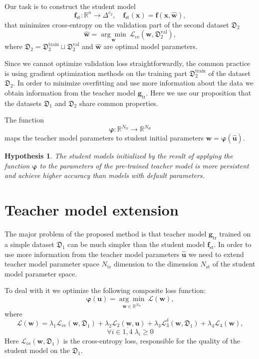 \documentclass[conference]{IEEEtran}
\begin{document}
Our task is to construct the student model
\[\mathbf{f}_\text{st}: \mathbb{R}^{n} \rightarrow \Delta^{c_2},\quad \mathbf{f}_\text{st}(\mathbf{x}) = \mathbf{f}(\mathbf{x}, \hat{\mathbf{w}}),\]
that minimizes cross-entropy on the validation part of the second dataset $\mathfrak{D}_2$
\[\hat{\mathbf{w}} =  \underset{\mathbf{w}}{\arg\min}~\mathcal{L}_\text{ce}(\mathbf{w}, \mathfrak{D}^\text{val}_2),\]
where $\mathfrak{D}_2 = \mathfrak{D}^\text{train}_2 \sqcup \mathfrak{D}^{\text{val}}_2$ and $\hat{\mathbf{w}}$ are optimal model parameters.

Since we cannot optimize validation loss straightforwardly, the common practice is using gradient optimization methods on the training part $\mathfrak{D}^\text{train}_2$ of the dataset $\mathfrak{D}_2$. In order to minimize overfitting and use more information about the data we obtain information from the teacher model $\mathbf{g}_{\text{tr}}$. Here we use our proposition that the datasets $\mathfrak{D}_1$ and $\mathfrak{D}_2$ share common properties. 

The function 
\[\boldsymbol{\varphi}: \mathbb{R}^{N_\text{tr}} \rightarrow \mathbb{R}^{N_\text{st}}\]
maps the teacher model parameters to student initial parameters $\mathbf{w} = \boldsymbol{\varphi}(\hat{\mathbf{u}})$.

\newtheorem{hypothesis}{Hypothesis}
\begin{hypothesis}
The student models initialized by the result of applying the function $\boldsymbol{\varphi}$ to the parameters of the pre-trained teacher model is more persistent and achieve higher accuracy than models with default parameters.
\end{hypothesis}

\section{Teacher model extension}
\label{sec:setup}
The major problem of the proposed method is that teacher model $\mathbf{g}_\text{tr}$ trained on a simple dataset $\mathfrak{D}_1$ can be much simpler than the student model $\mathbf{f}_\text{st}$. In order to use more information from the teacher model parameters $\hat{\mathbf{u}}$ we need to extend teacher model parameter space ${N_\text{tr}}$ dimension to the dimension ${N_\text{st}}$ of the student model parameter space. 

To deal with it we optimize the following composite loss function:
\begin{equation}\label{phi}
  \boldsymbol{\varphi}(\mathbf{u}) = \underset{\mathbf{w} \in \mathbb{R}^{N_\text{st}}}{\arg\min}~\mathcal{L}(\mathbf{w}),
\end{equation}
where \[\mathcal{L}(\mathbf{w}) = \lambda_1 \mathcal{L}_\text{ce}(\mathbf{w}, \mathfrak{D}_1) + \lambda_2 \mathcal{L}_2 (\mathbf{w}, \mathbf{u}) + \lambda_3 \mathcal{L}_3^\delta (\mathbf{w}, \mathfrak{D}_1) + \lambda_4 \mathcal{L}_4 (\mathbf{w}),\]
\[\forall i \in \overline{1, 4} \; \lambda_i \ge 0\] Here $\mathcal{L}_\text{ce}(\mathbf{w}, \mathfrak{D}_1)$ is the cross-entropy loss, responsible for the quality of the student model on the $\mathfrak{D}_1$.
\end{document}
